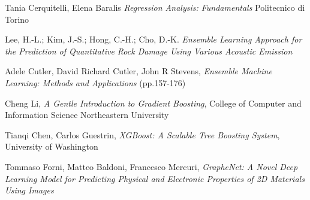 \documentclass[12pt,a4paper,openright,twoside]{report}
\begin{document}
\begin{thebibliography}{}
 Tania Cerquitelli, Elena Baralis
\emph{Regression Analysis: Fundamentals}
Politecnico di Torino

 Lee, H.-L.; Kim, J.-S.; Hong,
C.-H.; Cho, D.-K. \emph{Ensemble Learning
Approach for the Prediction of
Quantitative Rock Damage Using
Various Acoustic Emission}

 Adele Cutler, David Richard Cutler, John R Stevens,
\emph{Ensemble Machine Learning: Methods and Applications} (pp.157-176)

 Cheng Li,
\emph{A Gentle Introduction to Gradient Boosting},
College of Computer and Information Science
Northeastern University

 Tianqi Chen, Carlos Guestrin, 
\emph{XGBoost: A Scalable Tree Boosting System}, 
University of Washington

 Tommaso Forni, Matteo Baldoni, Francesco Mercuri, \emph{GrapheNet: A Novel Deep Learning Model for Predicting Physical and
Electronic Properties of 2D Materials Using Images}
\end{thebibliography}





\endgroup
\end{document}
